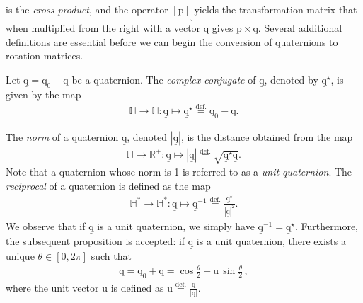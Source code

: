 \noindent is the \textit{cross product}, and the operator $[\bm{\mathrm{p}}]_{_{_\times}}$yields the transformation matrix that when multiplied from the right with a vector $\bm{\mathrm{q}}$ gives $\bm{\mathrm{p}}\times\bm{\mathrm{q}}$.
\bigbreak 
Several additional definitions are essential before we can begin the conversion of quaternions to rotation matrices. 


\noindent Let $\underline{\bm{\mathrm{q}}}=\mathrm{q}_0 + \bm{\mathrm{q}}$ be a quaternion. The \textit{complex conjugate} of $\underline{\bm{\mathrm{q}}}$, denoted by $\underline{\bm{\mathrm{q}}}^\star$, is given by the map
\begin{align*}
	\mathbb{H}\rightarrow\mathbb{H}:\underline{\bm{\mathrm{q}}}\mapsto\underline{\bm{\mathrm{q}}}^\star\stackrel{\text{def.}}{=}\mathrm{q}_0 - \bm{\mathrm{q}}.
\end{align*} 

\noindent The \textit{norm} of a quaternion $\underline{\bm{\mathrm{q}}}$, denoted $|\underline{\bm{\mathrm{q}}}|$, is the distance obtained from the map 
\begin{align*}
	\mathbb{H}\rightarrow\mathbb{R}^+:\underline{\bm{\mathrm{q}}}\mapsto|\underline{\bm{\mathrm{q}}}|\stackrel{\text{def.}}{=}\sqrt{\underline{\bm{\mathrm{q}}}^\star\underline{\bm{\mathrm{q}}}}.
\end{align*} 
Note that a quaternion whose norm is 1 is referred to as a \textit{unit quaternion}. The \textit{reciprocal} of a quaternion is defined as the map
\begin{align*}
	\mathbb{H}^*\rightarrow\mathbb{H}^*:\underline{\bm{\mathrm{q}}}\mapsto\underline{\bm{\mathrm{q}}}^{-1}\stackrel{\text{def.}}{=}\frac{\underline{\bm{\mathrm{q}}}^\star}{|\underline{\bm{\mathrm{q}}}|^2}.
\end{align*} 
We observe that if $\underline{\bm{\mathrm{q}}}$ is a unit quaternion, we simply have $\underline{\bm{\mathrm{q}}}^{-1}=\underline{\bm{\mathrm{q}}}^\star$. Furthermore, the subsequent proposition is accepted: if $\underline{\bm{\mathrm{q}}}$ is a unit quaternion, there exists a unique $\theta\in[0,2\pi]$ such that
\begin{align*}
	\underline{\bm{\mathrm{q}}} = \mathrm{q}_0 + \bm{\mathrm{q}}=\cos\frac{\theta}{2}+\bm{\mathrm{u}}\,\sin\frac{\theta}{2}\,,
\end{align*}
where the unit vector $\bm{\mathrm{u}}$ is defined as $\bm{\mathrm{u}}\stackrel{\text{def.}}{=}\frac{\bm{\mathrm{q}}}{|\bm{\mathrm{q}}|}$.

\setlength{\belowdisplayskip}{0.15cm}

